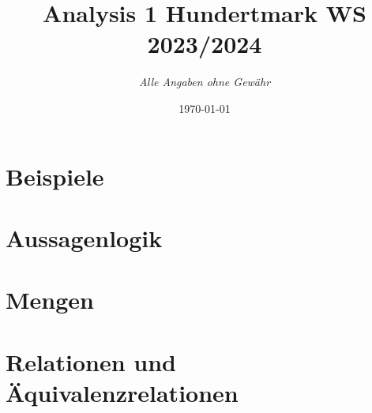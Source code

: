 \documentclass{report}
\title{Analysis 1 Hundertmark WS 2023/2024} %
\author{\textit{Alle Angaben ohne Gewähr}}
\date{\today} %
\begin{document}
\maketitle

\newpage


\chapter{Beispiele}

 \chapter{Aussagenlogik}%
 

 \chapter{Mengen}%
 

 \chapter{Relationen und Äquivalenzrelationen}%
 
 
\end{document}
